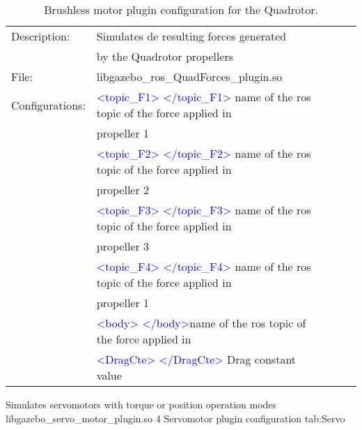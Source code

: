 	\begin{table}[h]
	\centering
	\begin{tabular}{|r|lrrr|}
		\hline
		\multicolumn{1}{|l|}{Description:} &  Simulates de resulting forces generated  &       &       &         \\
		& by the Quadrotor propellers &       &       &           \\
		\hline
		\multicolumn{1}{|l|}{File:} &  libgazebo\_ros\_QuadForces\_plugin.so &       &       &            \\
		\hline
		\multicolumn{1}{|l|}{Configurations: } & \textcolor{blue}{<topic\_F1> </topic\_F1>}  name of the ros topic of the force applied in 
		&       &       &      \\
		& propeller 1 &       &       &        \\
		&  \textcolor{blue}{<topic\_F2> </topic\_F2>} name of the ros topic of the force applied in &       &       &        \\
		& propeller 2 &       &       &       \\
		& \textcolor{blue}{<topic\_F3> </topic\_F3>}  name of the ros topic of the force applied in &       &       &        \\
		& propeller 3 &       &       &        \\
		& \textcolor{blue}{<topic\_F4> </topic\_F4>}   name of the ros topic of the force applied in   &       &       &       \\
		& propeller 1&       &       &     \\
		& \textcolor{blue}{<body> </body>}name of the ros topic of the force applied in &		&
		&		\\
		& \textcolor{blue}{<DragCte> </DragCte>} Drag constant value &		&
		&		\\
		\hline		
	\end{tabular}%
	\caption{Brushless motor plugin configuration for the Quadrotor.}
	\label{tab:QuadForces}%
\end{table}%





\begin{plugintable}
	{Simulates servomotors with torque or position operation modes}
	{libgazebo\_servo\_motor\_plugin.so}
	{4}
	{Servomotor plugin configuration}
	{tab:Servo}
\end{plugintable}

